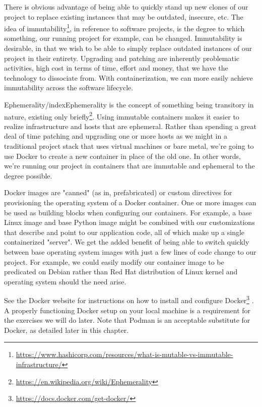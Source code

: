 \justify
There is obvious advantage of being able to quickly stand up new clones
of our project to replace existing instances that may be outdated,
insecure, etc. The idea of immutability\footnote{\url{https://www.hashicorp.com/resources/what-is-mutable-vs-immutable-infrastructure/}},
in reference to software projects, is the degree to which something, our
running project for example, can be changed. Immutability is desirable,
in that we wish to be able to simply replace outdated instances of our
project in their entirety. Upgrading and patching are inherently
problematic activities, high cost in terms of time, effort and money,
that we have the technology to dissociate from. With containerization,
we can more easily achieve immutability across the software lifecycle.

\justify
Ephemerality/index{Ephemerality} is the concept of something being transitory in nature,
existing only briefly\footnote{\url{https://en.wikipedia.org/wiki/Ephemerality}}.
Using immutable containers makes it easier to realize infrastructure and
hosts that are ephemeral. Rather than spending a great deal of time
patching and upgrading one or more hosts as we might in a traditional
project stack that uses virtual machines or bare metal, we're going to
use Docker to create a new container in place of the old one. In other
words, we're running our project in containers that are immutable and
ephemeral to the degree possible.

\justify
Docker images are "canned" (as in, prefabricated) or custom directives
for provisioning the operating system of a Docker container. One or more
images can be used as building blocks when configuring our containers.
For example, a base Linux image and base Python image might be combined
with our customizations that describe and point to our application code,
all of which make up a single containerized "server". We get the added
benefit of being able to switch quickly between base operating system
images with just a few lines of code change to our project. For example,
we could easily modify our container image to be predicated on Debian
rather than Red Hat distribution of Linux kernel and operating system
should the need arise.

\justify
See the Docker website for instructions on how to install and configure
Docker\footnote{\url{https://docs.docker.com/get-docker/}} . A properly
functioning Docker setup on your local machine is a requirement for the
exercises we will do later. Note that Podman is an acceptable substitute
for Docker, as detailed later in this chapter.

